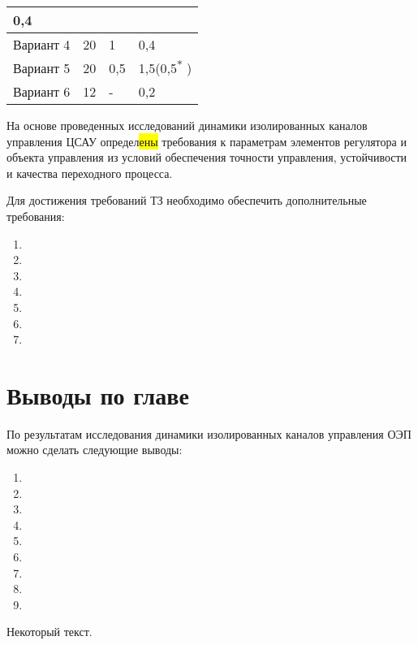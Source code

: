 \begin{table}[h]
\begin{tabular}{p{1.28in}p{1.47in}p{1.08in}p{1.67in}}
		\multicolumn{1}{|p{1.47in}|}{ 0,4} \\
		\hline
		\multicolumn{1}{|p{1.37in}}{Вариант 4} & 
		\multicolumn{1}{|p{1.47in}}{ 20} & 
		\multicolumn{1}{|p{1.18in}}{ 1} & 
		\multicolumn{1}{|p{1.47in}|}{ 0,4} \\
		\hline
		\multicolumn{1}{|p{1.37in}}{Вариант 5} & 
		\multicolumn{1}{|p{1.47in}}{ 20} & 
		\multicolumn{1}{|p{1.18in}}{ 0,5} & 
		\multicolumn{1}{|p{1.47in}|}{ 1,5(0,5\textsuperscript{$\ast$ })} \\
		\hline
		\multicolumn{1}{|p{1.37in}}{Вариант 6} & 
		\multicolumn{1}{|p{1.47in}}{ 12} & 
		\multicolumn{1}{|p{1.18in}}{ -} & 
		\multicolumn{1}{|p{1.47in}|}{ 0,2} \\
		\hline	
	\end{tabular}
\end{table}


На основе проведенных исследований динамики изолированных каналов управления ЦСАУ определ\colorbox{Yellow}{ены} требования к параметрам элементов регулятора и объекта управления из условий обеспечения точности управления, устойчивости и качества переходного процесса.\par

Для достижения требований ТЗ необходимо обеспечить дополнительные требования:

\begin{enumerate}
	\item 
	\item 
	\item 
	\item 
	\item 
	\item 
	\item 
\end{enumerate}





\section{Выводы по главе} \label{ch:ch4/sect8}

По результатам исследования динамики изолированных каналов управления ОЭП можно сделать следующие выводы:

\begin{enumerate}
	\item 
	\item 
	\item
	\item
	\item
	\item
	\item
	\item
	\item
\end{enumerate}




Некоторый текст.

\clearpage